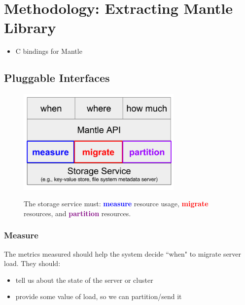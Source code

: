 \section{Methodology: Extracting Mantle Library}

\begin{itemize}
  \item C bindings for Mantle
\end{itemize}

\subsection{Pluggable Interfaces}

\begin{figure}[tb]
  \noindent\includegraphics[width=19pc,angle=0]{figures/mantle-pluggable-interfaces.png}\\
  \caption{The storage service must: \textcolor{blue}{\textbf{measure}}
  resource usage, \textcolor{red}{\textbf{migrate}} resources, and
  \textcolor{purple}{\textbf{partition}} resources. }
  \label{fig:mantle-pluggable-interfaces}
\end{figure}

\subsubsection{Measure}

The metrics measured should help the system decide ``when" to migrate server
load. They should:

\begin{itemize}
  \item tell us about the state of the server or cluster
  \item provide some value of load, so we can partition/send it
\end{itemize}

